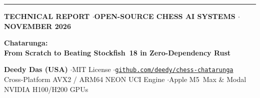 \documentclass[10.5pt,letterpaper]{article}
\begin{document}
\thispagestyle{empty}

{\color{dmblue}\rule{\textwidth}{2.6pt}}\par\vspace{10pt}
{\footnotesize\bfseries\color{dmblue} TECHNICAL REPORT \quad$\cdot$\quad OPEN-SOURCE CHESS AI SYSTEMS \quad$\cdot$\quad NOVEMBER 2026}\par\vspace{6pt}
{\fontsize{22}{27}\selectfont\bfseries\color{dmnavy} Chatarunga:\\
From Scratch to Beating Stockfish~18 in Zero-Dependency Rust}\par\vspace{8pt}
{\normalsize\color{dmslate} \textbf{Deedy Das (USA)} \quad$\cdot$\quad MIT License \quad$\cdot$\quad \href{https://github.com/deedy/chess-chatarunga}{\texttt{github.com/deedy/chess-chatarunga}}}\\
{\small\color{dmmuted} Cross-Platform AVX2 / ARM64 NEON UCI Engine \quad$\cdot$\quad Apple M5~Max \& Modal NVIDIA H100/H200 GPUs}\par\vspace{12pt}
\end{document}
